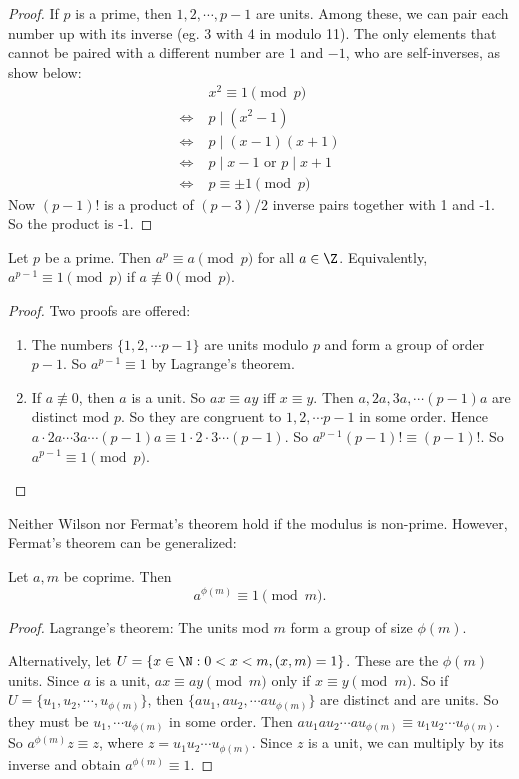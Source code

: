 \documentclass[a4paper]{article}
\begin{document}
\begin{proof}
  If $p$ is a prime, then $1, 2, \cdots, p - 1$ are units. Among these, we can pair each number up with its inverse (eg. 3 with 4 in modulo 11). The only elements that cannot be paired with a different number are $1$ and $-1$, who are self-inverses, as show below:
  \begin{align*}
    &\;x^2 \equiv 1\pmod p\\
    \Leftrightarrow&\; p \mid (x^2 - 1)\\
    \Leftrightarrow&\; p \mid (x - 1)(x + 1)\\
    \Leftrightarrow&\; p \mid x - 1 \text{ or } p \mid x + 1\\
    \Leftrightarrow&\; p \equiv \pm 1\pmod p
  \end{align*}
  Now $(p - 1)!$ is a product of $(p - 3)/2$ inverse pairs together with 1 and -1. So the product is -1.
\end{proof}

\begin{thm}
  Let $p$ be a prime. Then $a^p \equiv a\pmod p$ for all $a\in \Z$. Equivalently, $a^{p - 1}\equiv 1\pmod p$ if $a\not\equiv 0 \pmod p$.
\end{thm}

\begin{proof}
  Two proofs are offered:
  \begin{enumerate}
    \item The numbers $\{1, 2, \cdots p - 1\}$ are units modulo $p$ and form a group of order $p - 1$. So $a^{p - 1} \equiv 1$ by Lagrange's theorem.
    \item If $a\not\equiv 0$, then $a$ is a unit. So $ax \equiv ay$ iff $x\equiv y$. Then $a, 2a, 3a, \cdots (p - 1)a$ are distinct mod $p$. So they are congruent to $1, 2, \cdots p -1$ in some order. Hence $a\cdot 2a\cdots 3a\cdots (p - 1)a\equiv 1\cdot 2\cdot 3 \cdots (p - 1)$. So $a^{p - 1}(p - 1)! \equiv (p - 1)!$. So $a^{p - 1} \equiv 1\pmod p$.
  \end{enumerate}
\end{proof}
Neither Wilson nor Fermat's theorem hold if the modulus is non-prime. However, Fermat's theorem can be generalized:
\begin{thm}
  Let $a, m$ be coprime. Then
  \[
    a^{\phi(m)} \equiv 1\pmod m.
  \]
\end{thm}

\begin{proof}
  Lagrange's theorem: The units mod $m$ form a group of size $\phi(m)$.

  Alternatively, let $U = \{x\in \N: 0 < x < m, (x, m) = 1\}$. These are the $\phi(m)$ units. Since $a$ is a unit, $ax\equiv ay \pmod m$ only if $x\equiv y\pmod m$. So if $U = \{u_1, u_2, \cdots , u_{\phi(m)}\}$, then $\{au_1, au_2, \cdots au_{\phi(m)}\}$ are distinct and are units. So they must be $u_1, \cdots u_{\phi(m)}$ in some order. Then $au_1au_2\cdots au_{\phi(m)} \equiv u_1u_2\cdots u_{\phi(m)}$. So $a^{\phi(m)}z \equiv z$, where $z = u_1u_2\cdots u_{\phi(m)}$. Since $z$ is a unit, we can multiply by its inverse and obtain $a^{\phi(m)} \equiv 1$.
\end{proof}
\end{document}
